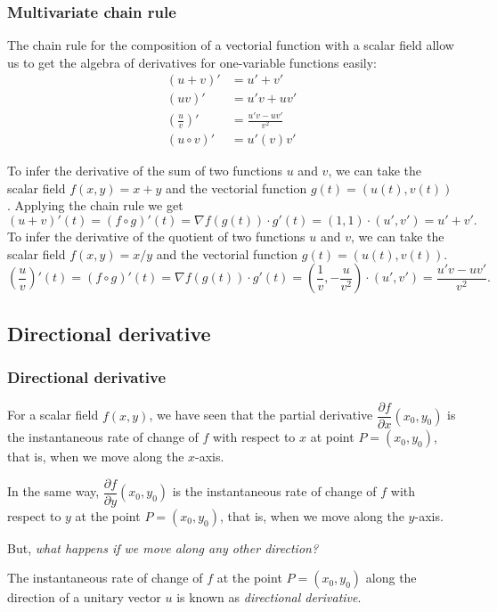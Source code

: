 \begin{frame}
\frametitle{Multivariate chain rule}
The chain rule for the composition of a vectorial function with a scalar field allow us to get the algebra of derivatives for one-variable functions easily:
\begin{align*}
(u+v)' &= u'+v'\\
(uv)' &= u'v+uv'\\
\left(\frac{u}{v}\right)' &= \frac{u'v-uv'}{v^2}\\
(u\circ v)' &= u'(v)v'
\end{align*}

To infer the derivative of the sum of two functions $u$ and $v$, we can take the scalar field $f(x,y)=x+y$ and the vectorial function $g(t)=(u(t),v(t))$. 
Applying the chain rule we get
\[
(u+v)'(t) = (f\circ g)'(t) = \nabla f(g(t))\cdot g'(t) = (1,1)\cdot (u',v') = u'+v'.
\]
To infer the derivative of the quotient of two functions $u$ and $v$, we can take the scalar field $f(x,y)=x/y$ and the vectorial function $g(t)=(u(t),v(t))$. 
\[
\left(\frac{u}{v}\right)'(t) = (f\circ g)'(t) = \nabla f(g(t))\cdot g'(t) = \left(\frac{1}{v},-\frac{u}{v^2}\right)\cdot (u',v') = \frac{u'v-uv'}{v^2}.
\]
\end{frame}



\subsection{Directional derivative}
\begin{frame}
\frametitle{Directional derivative}
For a scalar field $f(x,y)$, we have seen that the partial derivative $\dfrac{\partial f}{\partial x}(x_0,y_0)$ is the instantaneous rate of change of $f$ with respect to $x$ at point $P=(x_0,y_0)$, that is, when we move along the $x$-axis.

In the same way, $\dfrac{\partial f}{\partial y}(x_0,y_0)$ is the instantaneous rate of change of $f$ with respect to $y$ at the point $P=(x_0,y_0)$, that is, when we move along the $y$-axis.

But, \emph {what happens if we move along any other direction?}

The instantaneous rate of change of $f$ at the point $P=(x_0,y_0)$ along the direction of a unitary vector $u$ is known as \emph{directional derivative}.
\end{frame}


